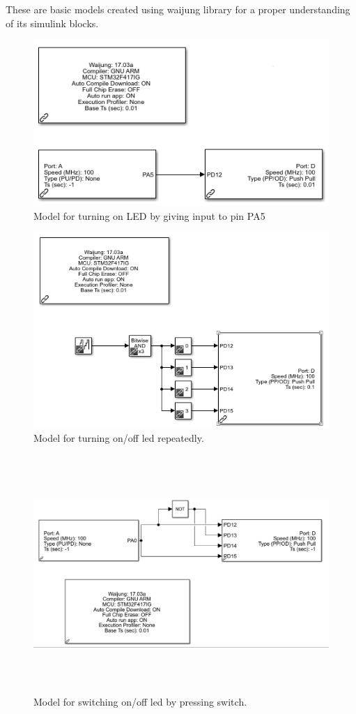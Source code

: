 These are basic models created using waijung library for a proper understanding of its simulink blocks.

\begin{figure}[hbt!]
    \centering
    \includegraphics{digital input.png}
    \caption{Model for turning on LED by giving input to pin PA5}
\end{figure}

\begin{figure}[hbt!]
    \centering
    \includegraphics{digital output.png}
    \caption{Model for turning on/off led repeatedly.}
\end{figure}

\newpage
\begin{figure}[hbt!]
    \centering
    \includegraphics[width=14cm,height=9cm]{turiningonoffswitch.png}
    \caption{Model for switching on/off led by pressing switch.}
\end{figure}
